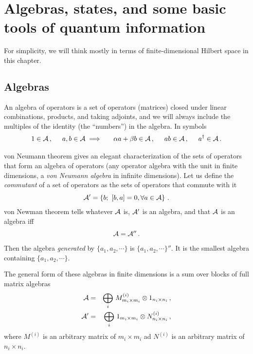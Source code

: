 \documentclass[11pt]{article}
\numberwithin{equation}{section}
\newcommand{\be}{\begin{equation}}
\newcommand{\ee}{\end{equation}}
\begin{document}
\newpage

\section{Algebras, states, and some basic tools of quantum information}
 
For simplicity, we will think mostly in terms of finite-dimensional Hilbert space in this chapter.

\subsection{Algebras}

 An algebra of operators is a set of operators (matrices) closed under linear combinations, products, and taking adjoints, and we will always include the multiples of the identity (the ``numbers'') in the algebra. In symbols
\be
1\in {\cal A}\,, \hspace{.5cm} a,b \in {\cal A}\implies  \hspace{.5cm} \alpha a +\beta b \in {\cal A}\,,\hspace{.5cm} a b\in {\cal A}\,,\hspace{.5cm} a^\dagger \in {\cal A}\,.   
\ee

von Neumann theorem gives an elegant characterization of the sets of operators that form an algebra of operators (any operator algebra with the unit in finite dimensions, a {\sl von Neumann algebra} in infinite dimensions). Let us define the {\sl commutant} of a set of operators as the sets of operators that commute with it
\be
{\cal A}' =\left\{b;\,\, [b,a]=0, \forall a\in {\cal A}   \right\}\,. 
\ee
von Newman theorem tells whatever ${\cal A}$ is, ${\cal A}'$ is an algebra, and that ${\cal A}$ is an algebra iff
\be
{\cal A}={\cal A}''\,. 
\ee
Then the algebra {\sl generated} by $\{a_1, a_2, \cdots \}$ is $\{a_1, a_2, \cdots \}''$. It is the smallest algebra containing $\{a_1, a_2, \cdots \}$. 

The general form of these algebras in finite dimensions is a sum over blocks of full matrix algebras   
\begin{eqnarray}
{\cal A} &=& \bigoplus_i \, M^{(i)}_{m_i\times m_i}\otimes 1_{n_i\times n_i}\,,\\
{\cal A}' &=& \bigoplus_i \,1_{m_i\times m_i} \otimes N^{(i)}_{n_i\times n_i} \,,
\end{eqnarray}
where $M^{(i)}$ is an arbitrary matrix of $m_i \times m_i$ ad $N^{(i)}$ is an arbitrary matrix of $n_i \times n_i$.
\end{document}

